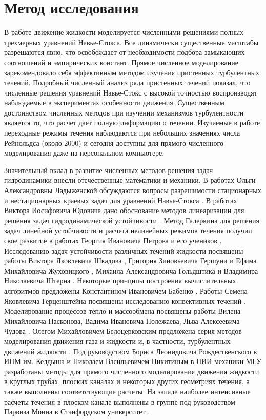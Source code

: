 
\chapter{Метод исследования}

В работе движение жидкости моделируется численными решениями полных трехмерных уравнений Навье-Стокса. Все динамически существенные масштабы разрешаются явно, что освобождает от необходимости подбора замыкающих соотношений и эмпирических констант. Прямое численное моделирование зарекомендовало себя эффективным методом изучения пристенных турбулентных течений. Подробный численный анализ ряда пристенных течений показал, что численные решения уравнений Навье-Стокс с высокой точностью воспроизводят наблюдаемые в экспериментах особенности движения. Существенным достоинством численных методов при изучении механизмов турбулентности является то, что расчет дает полную информацию о течении. Изучаемые в работе переходные режимы течения наблюдаются при небольших значениях числа Рейнольдса (около 2000) и сегодня доступны для прямого численного моделирования даже на персональном компьютере. 

Значительный вклад в развитие численных методов решения задач гидродинамики внесли отечественные математики и механики. В работах Ольги Александровны Ладыженской обсуждаются вопросы разрешимости стационарных и нестационарных краевых задач для уравнений Навье-Стокса \cite{Lad1970}. В работах Виктора Иосифовича Юдовича дано обоснование методов линеаризации для решения задач гидродинамической устойчивости \cite{Jud1984}. Метод Галеркина для решения задач линейной устойчивости и расчета нелинейных режимов течения получил свое развитие в работах Георгия Ивановича Петрова и его учеников \cite{Petrov1940}. Исследованию задач устойчивости различных течений жидкости посвящены работы Виктора Яковлевича Шкадова \cite{Sch1973, Ach2009}, Григория Зиновьевича Гершуни и Ефима Михайловича Жуховицкого \cite{Ger1972}, Михаила Александровича Гольдштика и Владимира Николаевича Штерна \cite{Gold1977}. Некоторые принципы построения вычислительных алгоритмов предложены Константином Ивановичем Бабенко \cite{Bab2002}. Работы Семена Яковлевича Герценштейна посвящены исследованию конвективных течений \cite{Gerc1973, Gerc1975}. Моделирование процессов тепло и массообмена посвящены работы Вилена Михайловича Пасконова, Вадима Ивановича Полежаева, Льва Алексеевича Чудова \cite{Pask1984, Pol1987}. Олегом Михайловичем Белоцерковским предложена серия методов моделирования движения газа и жидкости и, в частности, турбулентных движений жидкости \cite{Bel1994}. Под руководством Бориса Леонидовича Рождественского в ИПМ им. Келдыша \cite{Rog1973, Rog1984, Pri1987, Rog1987} %
и Николаем Васильевичем Никитиным в НИИ механики МГУ \cite{Nikitin1994a, Nikitin1994b, Nikitin1996, Nikitin2006} разработаны методы для прямого численного моделирования движения жидкости в круглых трубах, плоских каналах и некоторых других геометриях течения, а также выполнены соответствующие расчеты. На западе наиболее интенсивные расчеты течения в плоском канале выполнены в группе под руководством Парвиза Моина в Стэнфордском университет \cite{Moin1978, Moin1982, Kim1987}. %

